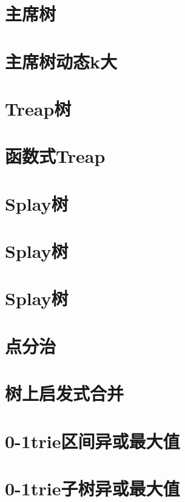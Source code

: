 \section{主席树}
\raggedbottom
\hrulefill
\section{主席树动态k大}
\raggedbottom
\hrulefill
\section{Treap树}
\raggedbottom
\hrulefill
\section{函数式Treap}
\raggedbottom
\hrulefill
\section{Splay树}
\raggedbottom
\hrulefill
\section{Splay树}
\raggedbottom
\hrulefill
\section{Splay树}
\raggedbottom
\hrulefill
\section{点分治}
\raggedbottom
\hrulefill
\section{树上启发式合并}
\raggedbottom
\hrulefill
\section{	0-1trie区间异或最大值}
\raggedbottom
\hrulefill
\section{	0-1trie子树异或最大值}
\raggedbottom
\hrulefill
